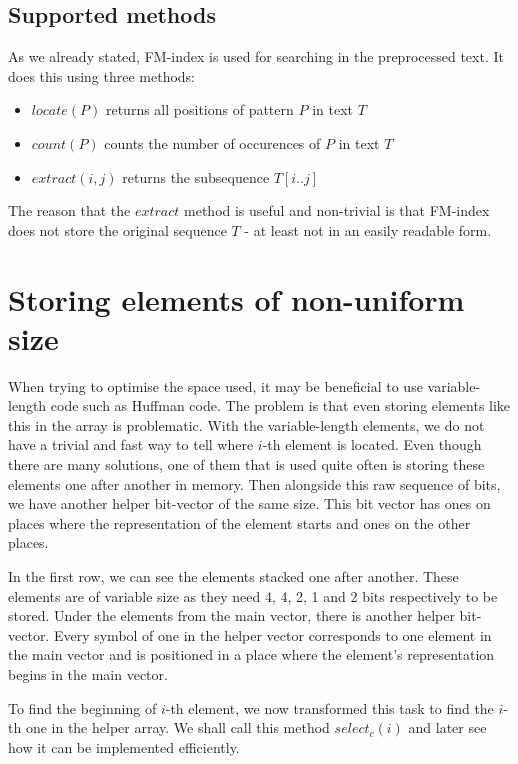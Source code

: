 \subsection{Supported methods}

As we already stated, FM-index is used for searching in the preprocessed text.
It does this using three methods:

\begin{itemize}
\item $locate(P)$ returns all positions of pattern $P$ in text $T$
\item $count(P)$ counts the number of occurences of $P$ in text $T$
\item $extract(i, j)$ returns the subsequence $T[i..j]$
\end{itemize}

The reason that the $extract$ method is useful and non-trivial is that FM-index
does not store the original sequence $T$ - at least not in an easily readable form.


\section{Storing elements of non-uniform size}

When trying to optimise the space used, it may be beneficial to use variable-length
code such as Huffman code. The problem is that even storing elements like this in
the array is problematic. With the variable-length elements, we do not have a trivial
and fast way to tell where $i$-th element is located. Even though there are many
solutions, one of them that is used quite often is storing these elements one after
another in memory. Then alongside this raw sequence of bits, we have another helper
bit-vector of the same size. This bit vector has ones on places where the representation
of the element starts and ones on the other places.

In the first row, we can see the elements stacked one after another. These elements
are of variable size as they need 4, 4, 2, 1 and 2 bits respectively to be stored.
Under the elements from the main vector, there is another helper bit-vector. Every
symbol of one in the helper vector corresponds to one element in the main vector
and is positioned in a place where the element's representation begins in the main vector.

To find the beginning of $i$-th element, we now transformed this task to find the
$i$-th one in the helper array. We shall call this method $select_c(i)$ and later
see how it can be implemented efficiently.

